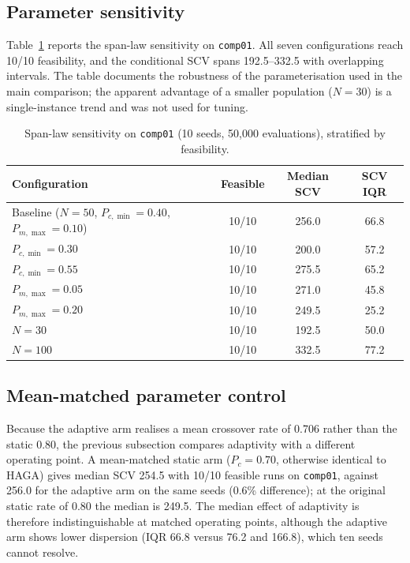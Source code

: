 \documentclass[journal]{IEEEtran}
\newcommand{\code}[1]{\texttt{#1}}
\begin{document}
\subsection{Parameter sensitivity}
Table~\ref{tab:sensitivity} reports the span-law sensitivity on \code{comp01}. All seven configurations reach 10/10 feasibility, and the conditional SCV spans 192.5--332.5 with overlapping intervals. The table documents the robustness of the parameterisation used in the main comparison; the apparent advantage of a smaller population ($N=30$) is a single-instance trend and was not used for tuning.

\begin{table}[!t]
\caption{Span-law sensitivity on \code{comp01} (10 seeds, 50{,}000 evaluations), stratified by feasibility.}
\label{tab:sensitivity}
\centering
\small
\begin{tabular}{l c c c}
\toprule
Configuration & Feasible & Median SCV & SCV IQR \\
\midrule
Baseline ($N=50$, $P_{c,\min}=0.40$, $P_{m,\max}=0.10$) & 10/10 & 256.0 & 66.8 \\
$P_{c,\min}=0.30$ & 10/10 & 200.0 & 57.2 \\
$P_{c,\min}=0.55$ & 10/10 & 275.5 & 65.2 \\
$P_{m,\max}=0.05$ & 10/10 & 271.0 & 45.8 \\
$P_{m,\max}=0.20$ & 10/10 & 249.5 & 25.2 \\
$N=30$ & 10/10 & 192.5 & 50.0 \\
$N=100$ & 10/10 & 332.5 & 77.2 \\
\bottomrule
\end{tabular}
\end{table}

\subsection{Mean-matched parameter control}
\label{sec:matched}
Because the adaptive arm realises a mean crossover rate of 0.706 rather than the static 0.80, the previous subsection compares adaptivity with a different operating point. A mean-matched static arm ($P_c=0.70$, otherwise identical to HAGA) gives median SCV 254.5 with 10/10 feasible runs on \code{comp01}, against 256.0 for the adaptive arm on the same seeds (0.6\% difference); at the original static rate of 0.80 the median is 249.5. The median effect of adaptivity is therefore indistinguishable at matched operating points, although the adaptive arm shows lower dispersion (IQR 66.8 versus 76.2 and 166.8), which ten seeds cannot resolve.
\end{document}
